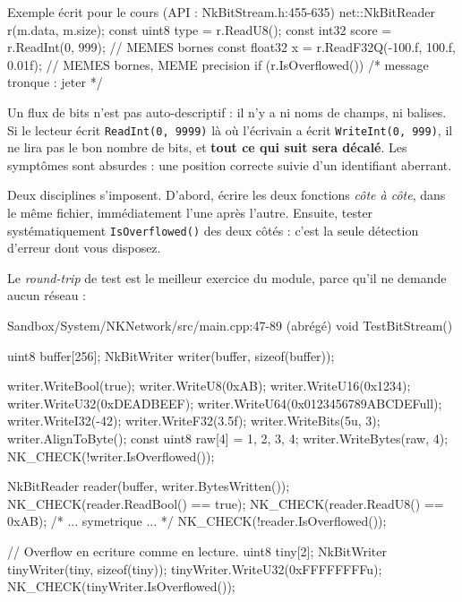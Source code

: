 \begin{nkpiege}
\begin{nkcode}{Exemple écrit pour le cours (API : NkBitStream.h:455-635)}
net::NkBitReader r(m.data, m.size);
const uint8  type  = r.ReadU8();
const int32  score = r.ReadInt(0, 999);                    // MEMES bornes
const float32 x    = r.ReadF32Q(-100.f, 100.f, 0.01f);     // MEMES bornes, MEME precision
if (r.IsOverflowed()) { /* message tronque : jeter */ }
\end{nkcode}

Un flux de bits n'est pas auto-descriptif : il n'y a ni noms de champs, ni
balises. Si le lecteur écrit \texttt{ReadInt(0, 9999)} là où l'écrivain a écrit
\texttt{WriteInt(0, 999)}, il ne lira pas le bon nombre de bits, et
\textbf{tout ce qui suit sera décalé}. Les symptômes sont absurdes : une position
correcte suivie d'un identifiant aberrant.

Deux disciplines s'imposent. D'abord, écrire les deux fonctions
\emph{côte à côte}, dans le même fichier, immédiatement l'une après l'autre.
Ensuite, tester systématiquement \texttt{IsOverflowed()} des deux côtés : c'est
la seule détection d'erreur dont vous disposez.
\end{nkpiege}

Le \emph{round-trip} de test est le meilleur exercice du module, parce qu'il ne
demande aucun réseau :

\begin{nkcode}{Sandbox/System/NKNetwork/src/main.cpp:47-89 (abrégé)}
    void TestBitStream() {
        uint8 buffer[256];
        NkBitWriter writer(buffer, sizeof(buffer));

        writer.WriteBool(true);
        writer.WriteU8(0xAB);
        writer.WriteU16(0x1234);
        writer.WriteU32(0xDEADBEEF);
        writer.WriteU64(0x0123456789ABCDEFull);
        writer.WriteI32(-42);
        writer.WriteF32(3.5f);
        writer.WriteBits(5u, 3);
        writer.AlignToByte();
        const uint8 raw[4] = {1, 2, 3, 4};
        writer.WriteBytes(raw, 4);
        NK_CHECK(!writer.IsOverflowed());

        NkBitReader reader(buffer, writer.BytesWritten());
        NK_CHECK(reader.ReadBool() == true);
        NK_CHECK(reader.ReadU8() == 0xAB);
        /* ... symetrique ... */
        NK_CHECK(!reader.IsOverflowed());

        // Overflow en ecriture comme en lecture.
        uint8 tiny[2];
        NkBitWriter tinyWriter(tiny, sizeof(tiny));
        tinyWriter.WriteU32(0xFFFFFFFFu);
        NK_CHECK(tinyWriter.IsOverflowed());
    }
\end{nkcode}

